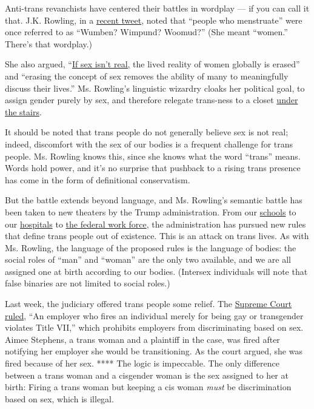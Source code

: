 Anti-trans revanchists have centered their battles in wordplay --- if
you can call it that. J.K. Rowling, in a
\href{https://twitter.com/jk_rowling/status/1269382518362509313}{recent
tweet}, noted that ``people who menstruate'' were once referred to as
``Wumben? Wimpund? Woomud?'' (She meant ``women.'' There's that
wordplay.)

She also argued,
``\href{https://twitter.com/jk_rowling/status/1269389298664701952}{If
sex isn't real,} the lived reality of women globally is erased'' and
``erasing the concept of sex removes the ability of many to meaningfully
discuss their lives.'' Ms. Rowling's linguistic wizardry cloaks her
political goal, to assign gender purely by sex, and therefore relegate
trans-ness to a closet
\href{https://harrypotter.fandom.com/wiki/Cupboard_Under_the_Stairs}{under
the stairs}.

It should be noted that trans people do not generally believe sex is not
real; indeed, discomfort with the sex of our bodies is a frequent
challenge for trans people. Ms. Rowling knows this, since she knows what
the word ``trans'' means. Words hold power, and it's no surprise that
pushback to a rising trans presence has come in the form of definitional
conservatism.

But the battle extends beyond language, and Ms. Rowling's semantic
battle has been taken to new theaters by the Trump administration. From
our
\href{https://www.nytimes.com/2018/10/21/us/politics/transgender-trump-administration-sex-definition.html}{schools}
to our
\href{https://www.nytimes.com/2020/06/12/us/politics/trump-transgender-rights.html}{hospitals}
to
\href{https://www.nytimes.com/2019/12/06/us/politics/trump-transgender-rights.html}{the
federal work force}, the administration has pursued new rules that
define trans people out of existence. This is an attack on trans lives.
As with Ms. Rowling, the language of the proposed rules is the language
of bodies: the social roles of ``man'' and ``woman'' are the only two
available, and we are all assigned one at birth according to our bodies.
(Intersex individuals will note that false binaries are not limited to
social roles.)

Last week, the judiciary offered trans people some relief. The
\href{https://www.supremecourt.gov/opinions/19pdf/17-1618_hfci.pdf}{Supreme
Court ruled}, ``An employer who fires an individual merely for being gay
or transgender violates Title VII,'' which prohibits employers from
discriminating based on sex. Aimee Stephens, a trans woman and a
plaintiff in the case, was fired after notifying her employer she would
be transitioning. As the court argued, she was fired because of her sex.
**** The logic is impeccable. The only difference between a trans woman
and a cisgender woman is the sex assigned to her at birth: Firing a
trans woman but keeping a cis woman \emph{must} be discrimination based
on sex, which is illegal.

